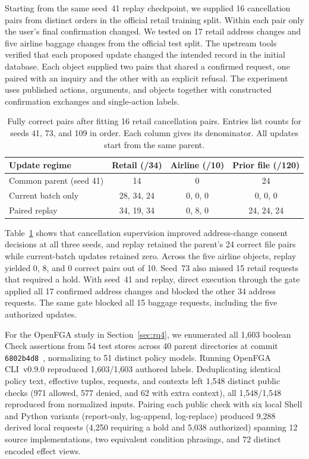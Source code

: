 Starting from the same seed~41 replay checkpoint, we supplied 16 cancellation pairs from distinct orders in the official retail training split. Within each pair only the user's final confirmation changed. We tested on 17 retail address changes and five airline baggage changes from the official test split. The upstream tools verified that each proposed update changed the intended record in the initial database. Each object supplied two pairs that shared a confirmed request, one paired with an inquiry and the other with an explicit refusal. The experiment uses published actions, arguments, and objects together with constructed confirmation exchanges and single-action labels.

\begin{table}[!ht]
\centering\small
\caption{Fully correct pairs after fitting 16 retail cancellation pairs. Entries list counts for seeds 41, 73, and 109 in order. Each column gives its denominator. All updates start from the same parent.}
\label{tab:continual-transfer}
\begin{tabular}{@{}lccc@{}}\toprule
Update regime & Retail (/34) & Airline (/10) & Prior file (/120)\\\midrule
Common parent (seed 41) & 14 & 0 & 24\\
Current batch only & 28, 34, 24 & 0, 0, 0 & 0, 0, 0\\
Paired replay & 34, 19, 34 & 0, 8, 0 & 24, 24, 24\\\bottomrule
\end{tabular}
\end{table}

Table~\ref{tab:continual-transfer} shows that cancellation supervision improved address-change consent decisions at all three seeds, and replay retained the parent's 24 correct file pairs while current-batch updates retained zero. Across the five airline objects, replay yielded 0, 8, and 0 correct pairs out of 10. Seed~73 also missed 15 retail requests that required a hold. With seed~41 and replay, direct execution through the gate applied all 17 confirmed address changes and blocked the other 34 address requests. The same gate blocked all 15 baggage requests, including the five authorized updates.

For the OpenFGA study in Section~\ref{sec:rq4}, we enumerated all 1,603 boolean Check assertions from 54 test stores across 40 parent directories at commit \texttt{6802b4d8}~\cite{openfgastores}, normalizing to 51 distinct policy models. Running OpenFGA CLI~v0.9.0 reproduced 1,603/1,603 authored labels. Deduplicating identical policy text, effective tuples, requests, and contexts left 1,548 distinct public checks (971 allowed, 577 denied, and 62 with extra context), all 1,548/1,548 reproduced from normalized inputs. Pairing each public check with six local Shell and Python variants (report-only, log-append, log-replace) produced 9,288 derived local requests (4,250 requiring a hold and 5,038 authorized) spanning 12 source implementations, two equivalent condition phrasings, and 72 distinct encoded effect views.

